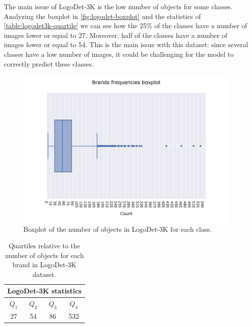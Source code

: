The main issue of LogoDet-3K is the low number of objects for some classes. Analyzing the boxplot in \autoref{fig:logodet-boxplot} and the statistics of \autoref{table:logodet3k-quartile} we can see how the 25\% of the classes have a number of images lower or equal to 27. Moreover, half of the classes have a number of images lower or equal to 54. This is the main issue with this dataset: since several classes have a low number of images, it could be challenging for the model to correctly predict these classes.  



\begin{figure}[ht]
	\centering

    \begin{center}
        \includegraphics[width=\columnwidth]{images/box_plot.jpeg}
    \end{center}
	\caption{Boxplot of the number of objects in LogoDet-3K for each class.}%
	\label{fig:logodet-boxplot}%
\end{figure}


\begin{table}[ht]
    \centering
    \begin{tabular}{c  c  c  c } 
     \hline
     \multicolumn{4}{c}{LogoDet-3K statistics}\\
     \hline
     \textbf{$Q_1$} & \textbf{$Q_2$} & \textbf{$Q_3$} & \textbf{$Q_4$} \\
     \hline
     27 & 54 & 86 & 532 \\
    \end{tabular}
    \caption{Quartiles relative to the number of objects for each brand in LogoDet-3K dataset.}
    \label{table:logodet3k-quartile}
\end{table}

